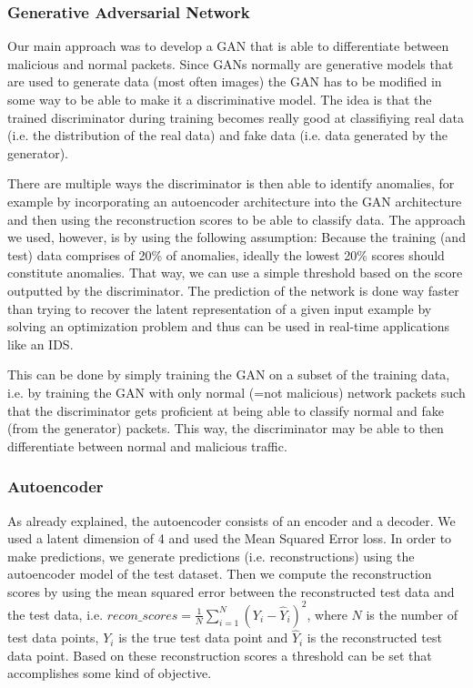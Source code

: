 \documentclass[]{article}
\begin{document}
	 
	 
	\subsubsection{Generative Adversarial Network}
	 Our main approach was to develop a GAN that is able to differentiate between malicious and normal packets. Since GANs normally are generative models that are used to generate data (most often images) the GAN has to be modified in some way to be able to make it a discriminative model.  The idea is that the trained discriminator during training becomes really good at classifiying real data (i.e. the distribution of the real data) and fake data (i.e. data generated by the generator). 
	 \newline
	 
	 \noindent
	 There are multiple ways the discriminator is then able to identify anomalies, for example by incorporating an autoencoder architecture into the GAN architecture and then using the reconstruction scores to be able to classify data. The approach we used, however, is by using the following assumption: Because the training (and test) data comprises of 20\% of anomalies, ideally the lowest 20\% scores should constitute anomalies. That way, we can use a simple threshold based on the score outputted by the discriminator. The prediction of the network is done way faster than trying to recover the latent representation of a given input example by solving an optimization problem and thus can be used in real-time applications like an IDS.
	
	 This can be done by simply training the GAN on a subset of the training data, i.e. by training the GAN with only normal (=not malicious) network packets such that the discriminator gets proficient at being able to classify normal and fake (from the generator) packets. This way, the discriminator may be able to then differentiate between normal and malicious traffic. 
	 
     \subsubsection{Autoencoder}
     As already explained, the autoencoder consists of an encoder and a decoder. We used a latent dimension of 4 and used the Mean Squared Error loss. In order to make predictions, we generate predictions (i.e. reconstructions) using the autoencoder model of the test dataset. Then we compute the reconstruction scores by using the mean squared error between the reconstructed test data and the test data, i.e. $recon\_scores = \frac{1}{N} \sum_{i=1}^{N} (Y_i - \hat{Y}_i)^2$, where $N$ is the number of test data points, $Y_i$ is the true test data point and $\hat{Y}_i$ is the reconstructed test data point. Based on these reconstruction scores a threshold can be set that accomplishes some kind of objective.
     
\end{document}
